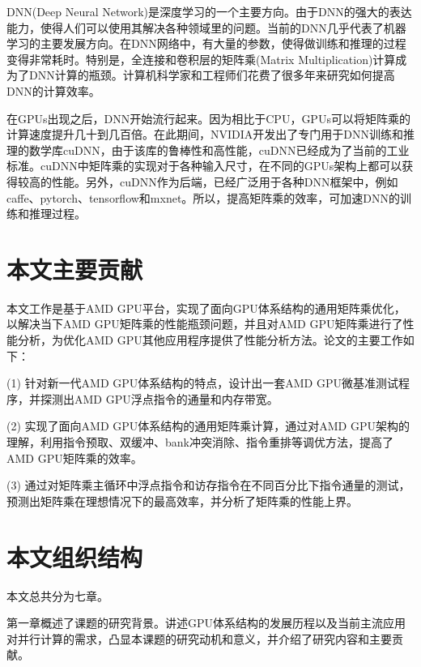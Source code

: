 DNN(Deep Neural Network)是深度学习的一个主要方向。由于DNN的强大的表达能力，使得人们可以使用其解决各种领域里的问题。当前的DNN几乎代表了机器学习的主要发展方向。在DNN网络中，有大量的参数，使得做训练和推理的过程变得非常耗时。特别是，全连接和卷积层的矩阵乘(Matrix Multiplication)计算成为了DNN计算的瓶颈。计算机科学家和工程师们花费了很多年来研究如何提高DNN的计算效率。

在GPUs出现之后，DNN开始流行起来。因为相比于CPU，GPUs可以将矩阵乘的计算速度提升几十到几百倍。在此期间，NVIDIA开发出了专门用于DNN训练和推理的数学库cuDNN，由于该库的鲁棒性和高性能，cuDNN已经成为了当前的工业标准。cuDNN中矩阵乘的实现对于各种输入尺寸，在不同的GPUs架构上都可以获得较高的性能。另外，cuDNN作为后端，已经广泛用于各种DNN框架中，例如caffe、pytorch、tensorflow和mxnet。所以，提高矩阵乘的效率，可加速DNN的训练和推理过程。


\section{本文主要贡献}
本文工作是基于AMD GPU平台，实现了面向GPU体系结构的通用矩阵乘优化，以解决当下AMD GPU矩阵乘的性能瓶颈问题，并且对AMD GPU矩阵乘进行了性能分析，为优化AMD GPU其他应用程序提供了性能分析方法。论文的主要工作如下：

%


 (1) 针对新一代AMD GPU体系结构的特点，设计出一套AMD GPU微基准测试程序，并探测出AMD GPU浮点指令的通量和内存带宽。

 (2) 实现了面向AMD GPU体系结构的通用矩阵乘计算，通过对AMD GPU架构的理解，利用指令预取、双缓冲、bank冲突消除、指令重排等调优方法，提高了AMD GPU矩阵乘的效率。

 (3) 通过对矩阵乘主循环中浮点指令和访存指令在不同百分比下指令通量的测试，预测出矩阵乘在理想情况下的最高效率，并分析了矩阵乘的性能上界。


\section{本文组织结构}
本文总共分为七章。

第一章概述了课题的研究背景。讲述GPU体系结构的发展历程以及当前主流应用对并行计算的需求，凸显本课题的研究动机和意义，并介绍了研究内容和主要贡献。

